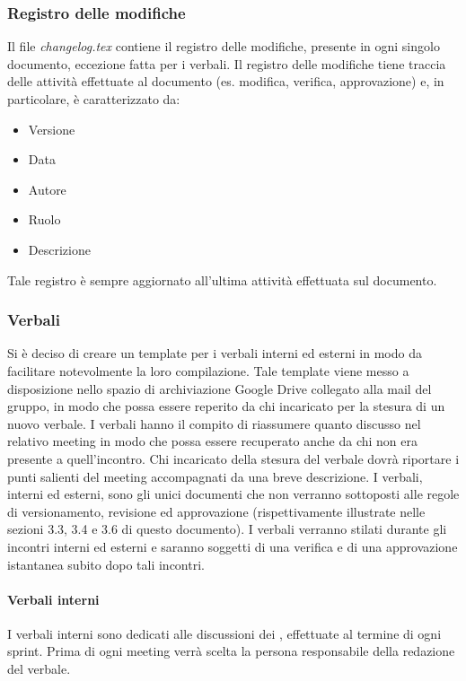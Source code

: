 \subsubsection{Registro delle modifiche}
Il file \textit{changelog.tex} contiene il registro delle modifiche, presente in ogni singolo documento, eccezione fatta per i verbali. 
Il registro delle modifiche tiene traccia delle attività effettuate al documento (es. modifica, verifica, approvazione) e, in particolare, è caratterizzato da:
\begin{itemize}
\item Versione
\item Data
\item Autore
\item Ruolo
\item Descrizione
\end{itemize}
Tale registro è sempre aggiornato all'ultima attività effettuata sul documento.

\subsubsection{Verbali}
Si è deciso di creare un template per i verbali interni ed esterni in modo da facilitare notevolmente la loro compilazione. Tale template viene messo a disposizione nello spazio di archiviazione  Google Drive\glo{} collegato alla mail del gruppo, in modo che possa essere reperito da chi incaricato per la stesura di un nuovo verbale.
I verbali hanno il compito di riassumere quanto discusso nel relativo meeting in modo che possa essere recuperato anche da chi non era presente a quell'incontro.
Chi incaricato della stesura del verbale dovrà riportare i punti salienti del meeting accompagnati da una breve descrizione.
I verbali, interni ed esterni, sono gli unici documenti che non verranno sottoposti alle regole di versionamento, revisione ed approvazione (rispettivamente illustrate nelle sezioni 3.3, 3.4 e
3.6 di questo documento). I verbali verranno stilati durante gli incontri interni ed esterni e saranno soggetti di una verifica e di una approvazione istantanea subito dopo tali incontri.

\paragraph{Verbali interni}
I verbali interni sono dedicati alle discussioni dei \groupName{}, effettuate al termine di ogni sprint. Prima di ogni meeting verrà scelta la persona responsabile della redazione del verbale. 

